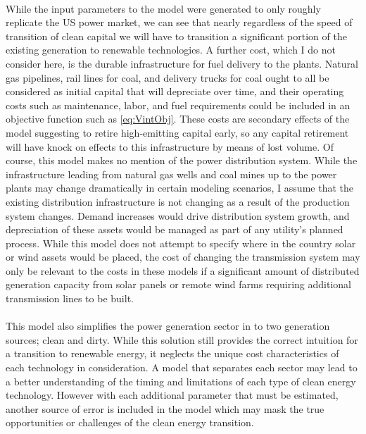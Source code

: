 \documentclass{article}
\begin{document}
\paragraph{} While the input parameters to the model were generated to only roughly replicate the US power market, we can see that nearly regardless of the speed of transition of clean capital we will have to transition a significant portion of the existing generation to renewable technologies. A further cost, which I do not consider here, is the durable infrastructure for fuel delivery to the plants. Natural gas pipelines, rail lines for coal, and delivery trucks for coal ought to all be considered as initial capital that will depreciate over time, and their operating costs such as maintenance, labor, and fuel requirements could be included in an objective function such as \ref{eq:VintObj}. These costs are secondary effects of the model suggesting to retire high-emitting capital early, so any capital retirement will have knock on effects to this infrastructure by means of lost volume. Of course, this model makes no mention of the power distribution system. While the infrastructure leading from natural gas wells and coal mines up to the power plants may change dramatically in certain modeling scenarios, I assume that the existing distribution infrastructure is not changing as a result of the production system changes. Demand increases would drive distribution system growth, and depreciation of these assets would be managed as part of any utility's planned process. While this model does not attempt to specify where in the country solar or wind assets would be placed, the cost of changing the transmission system may only be relevant to the costs in these models if a significant amount of distributed generation capacity from solar panels or remote wind farms requiring additional transmission lines to be built. 

\paragraph{} This model also simplifies the power generation sector in to two generation sources; clean and dirty. While this solution still provides the correct intuition for a transition to renewable energy, it neglects the unique cost characteristics of each technology in consideration. A model that separates each sector may lead to a better understanding of the timing and limitations of each type of clean energy technology. However with each additional parameter that must be estimated, another source of error is included in the model which may mask the true opportunities or challenges of the clean energy transition. 
\end{document}
